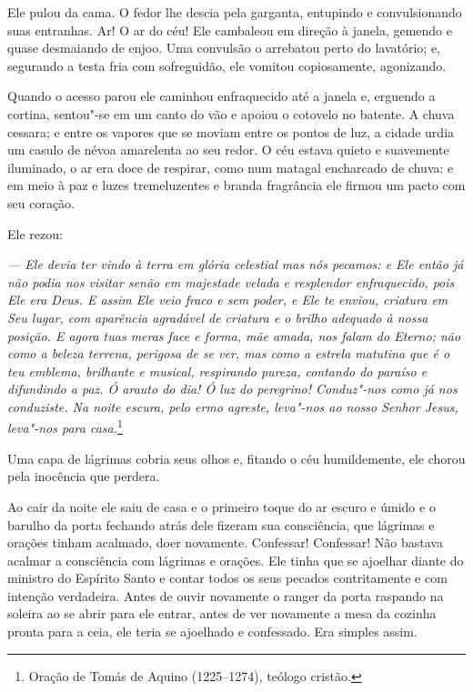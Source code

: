 Ele pulou da cama. O fedor lhe descia pela garganta, entupindo e
convulsionando suas entranhas. Ar! O ar do céu! Ele cambaleou em
direção à janela, gemendo e quase desmaiando de enjoo. Uma convulsão o
arrebatou perto do lavatório; e, segurando a testa fria com
sofreguidão, ele vomitou copiosamente, agonizando.

Quando o acesso parou ele caminhou enfraquecido até a janela e, erguendo
a cortina, sentou"-se em um canto do vão e apoiou o cotovelo no batente.
A chuva cessara; e entre os vapores que se moviam entre os pontos de
luz, a cidade urdia um casulo de névoa amarelenta ao seu redor. O céu
estava quieto e suavemente iluminado, o ar era doce de respirar, como
num matagal encharcado de chuva: e em meio à paz e luzes tremeluzentes
e branda fragrância ele firmou um pacto com seu coração.

Ele rezou:

{\itshape
 --- Ele devia ter vindo à terra em glória celestial mas nós
pecamos: e Ele então já não podia nos visitar senão em majestade velada
e resplendor enfraquecido, pois Ele era Deus. E assim Ele veio fraco e
sem poder, e Ele te enviou, criatura em Seu lugar, com aparência
agradável de criatura e o brilho adequado à nossa posição. E agora tuas
meras face e forma, mãe amada, nos falam do Eterno; não como a beleza
terrena, perigosa de se ver, mas como a estrela matutina que é o teu
emblema, brilhante e musical, respirando pureza, contando do paraíso e
difundindo a paz. Ó arauto do dia! Ó luz do
peregrino! Conduz"-nos como já nos conduziste. Na noite escura,
pelo ermo agreste, leva"-nos ao nosso Senhor Jesus, leva"-nos para casa.}\footnote{ Oração de Tomás de Aquino (1225--1274), teólogo cristão.}

Uma capa de lágrimas cobria seus olhos e, fitando o céu humildemente,
ele chorou pela inocência que perdera.

Ao cair da noite ele saiu de casa e o primeiro toque do ar escuro e
úmido e o barulho da porta fechando atrás dele fizeram sua consciência,
que lágrimas e orações tinham acalmado, doer novamente. Confessar!
Confessar! Não bastava acalmar a consciência com lágrimas e orações.
Ele tinha que se ajoelhar diante do ministro do Espírito Santo e contar
todos os seus pecados contritamente e com intenção verdadeira. Antes de
ouvir novamente o ranger da porta raspando na soleira ao se abrir para
ele entrar, antes de ver novamente a mesa da cozinha pronta para a
ceia, ele teria se ajoelhado e confessado. Era simples assim.

